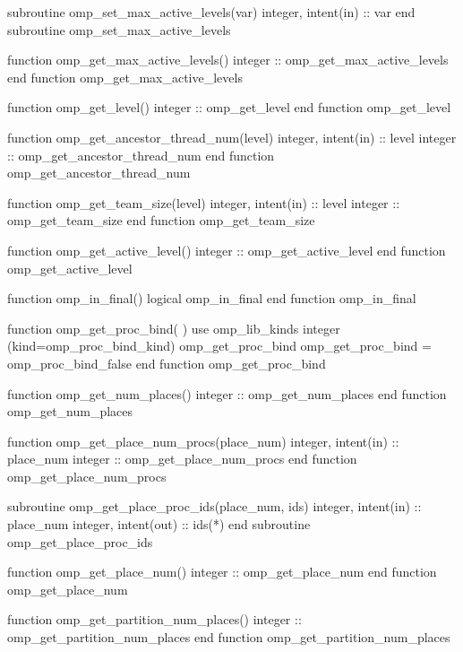 {\begin{codepar}
          subroutine omp\_set\_max\_active\_levels(var)
           integer, intent(in) :: var
          end subroutine omp\_set\_max\_active\_levels

          function omp\_get\_max\_active\_levels()
           integer :: omp\_get\_max\_active\_levels
          end function omp\_get\_max\_active\_levels

          function omp\_get\_level()
           integer :: omp\_get\_level
          end function omp\_get\_level

          function omp\_get\_ancestor\_thread\_num(level)
           integer, intent(in) :: level
           integer :: omp\_get\_ancestor\_thread\_num
          end function omp\_get\_ancestor\_thread\_num

          function omp\_get\_team\_size(level)
           integer, intent(in) :: level
           integer :: omp\_get\_team\_size
          end function omp\_get\_team\_size

          function omp\_get\_active\_level()
           integer :: omp\_get\_active\_level
          end function omp\_get\_active\_level

          function omp\_in\_final()
           logical omp\_in\_final
          end function omp\_in\_final

          function omp\_get\_proc\_bind( )
           use omp\_lib\_kinds
           integer (kind=omp\_proc\_bind\_kind) omp\_get\_proc\_bind
           omp\_get\_proc\_bind = omp\_proc\_bind\_false
          end function omp\_get\_proc\_bind

          function omp\_get\_num\_places()
          integer :: omp\_get\_num\_places
          end function omp\_get\_num\_places

          function omp\_get\_place\_num\_procs(place\_num)
          integer, intent(in) :: place\_num
          integer :: omp\_get\_place\_num\_procs
          end function omp\_get\_place\_num\_procs

          subroutine omp\_get\_place\_proc\_ids(place_num, ids)
          integer, intent(in) :: place\_num
          integer, intent(out) :: ids(*)
          end subroutine omp\_get\_place\_proc\_ids

          function omp\_get\_place\_num()
          integer :: omp\_get\_place\_num
          end function omp\_get\_place\_num

          function omp\_get\_partition\_num\_places()
          integer :: omp\_get\_partition\_num\_places
          end function omp\_get\_partition\_num\_places


\end{codepar}}
